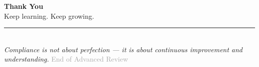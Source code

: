 \documentclass[12pt,aspectratio=169]{beamer}
\begin{document}
	\begin{frame}
		\centering
		\vspace{2.5cm}
		{\fontsize{16}{19}\selectfont \textbf{Thank You}} \\[0.2cm]
		{\fontsize{11}{13}\selectfont Keep learning. Keep growing.} \\[0.15cm]
		\rule{3cm}{0.5pt} \\[0.15cm]
		{\fontsize{8}{10}\selectfont \textit{Compliance is not about perfection — it is about continuous improvement and understanding.}}
		\vspace{0.3cm}
		{\fontsize{7}{9}\selectfont \textcolor{darkgray}{End of Advanced Review}}
	\end{frame}
	
\end{document}

